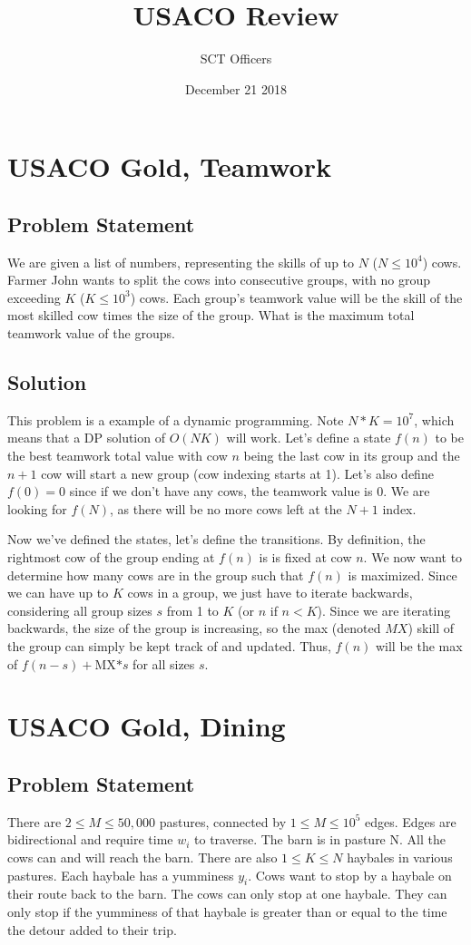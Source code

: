 \documentclass{article}
\title{USACO Review}
\author{SCT Officers}
\date{December 21 2018}
\begin{document}
\maketitle


\section{USACO Gold, Teamwork}
\subsection{Problem Statement}
    We are given a list of numbers, representing the skills of up to $N$ ($N \leq 10^4$) cows. Farmer John wants to split the cows into consecutive groups, with no group exceeding $K$ ($K \leq 10^3$) cows. Each group's teamwork value will be the skill of the most skilled cow times the size of the group. What is the maximum total teamwork value of the groups.
    
\subsection{Solution}
    This problem is a example of a dynamic programming. Note $N*K = 10^7$, which means that a DP solution of $O(NK)$ will work. Let's define a state $f(n)$ to be the best teamwork total value with cow $n$ being the last cow in its group and the $n+1$ cow will start a new group (cow indexing starts at 1). Let's also define $f(0) = 0$ since if we don't have any cows, the teamwork value is 0. We are looking for $f(N)$, as there will be no more cows left at the $N+1$ index.
    
    Now we've defined the states, let's define the transitions. By definition, the rightmost cow of the group ending at $f(n)$ is is fixed at cow $n$. We now want to determine how many cows are in the group such that $f(n)$ is maximized. Since we can have up to $K$ cows in a group, we just have to iterate backwards, considering all group sizes $s$ from 1 to $K$ (or $n$ if $n<K$). Since we are iterating backwards, the size of the group is increasing, so the max (denoted $MX$) skill of the group can simply be kept track of and updated. Thus, $f(n)$ will be the max of $f(n-s) + $MX$*s$ for all sizes $s$.
    
\section {USACO Gold, Dining}
\subsection{Problem Statement}
    There are $2\leq M \leq 50,000$ pastures, connected by $1\leq M \leq 10^5$ edges. Edges are bidirectional and require time $w_i$ to traverse. The barn is in pasture N. All the cows can and will reach the barn. There are also $1\leq K \leq N$ haybales in various pastures. Each haybale has a yumminess $y_i$. Cows want to stop by a haybale on their route back to the barn. The cows can only stop at one haybale. They can only stop if the yumminess of that haybale is greater than or equal to the time the detour added to their trip.
    
\end{document}
